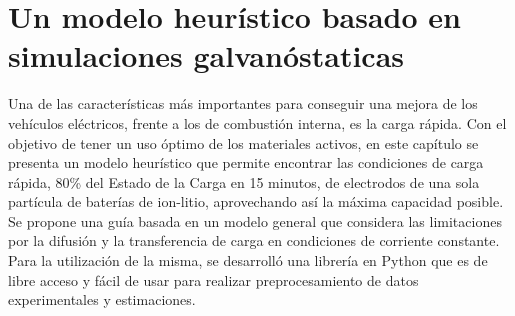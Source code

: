 \chapter{Un modelo heurístico basado en simulaciones galvanóstaticas}\label{ch:un}
\thispagestyle{empty}

\vspace{50pt}

\begin{adjustwidth}{50pt}{50pt}
    Una de las características más importantes para conseguir una mejora de los 
    vehículos eléctricos, frente a los de combustión interna, es la carga rápida.
    Con el objetivo de tener un uso óptimo de los materiales activos, en este
    capítulo se presenta un modelo heurístico que permite encontrar las 
    condiciones de carga rápida, 80\% del Estado de la Carga en 15 minutos, de
    electrodos de una sola partícula de baterías de ion-litio, aprovechando así
    la máxima capacidad posible. Se propone una guía basada en un modelo general 
    que considera las limitaciones por la difusión y la transferencia de carga 
    en condiciones de corriente constante. Para la utilización de la misma, se 
    desarrolló una librería en Python que es de libre acceso y fácil de usar para 
    realizar preprocesamiento de datos experimentales y estimaciones.
\end{adjustwidth}

\clearpage
\newpage
\thispagestyle{empty}
\mbox{}
\newpage





